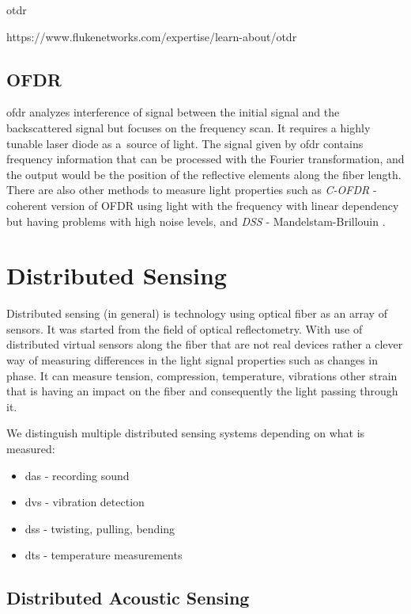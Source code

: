 \acl{otdr} 

https://www.flukenetworks.com/expertise/learn-about/otdr


\subsection{OFDR}

\ac{ofdr} analyzes interference of signal between the initial signal and the backscattered signal but focuses on the frequency scan. It requires a highly tunable laser diode as a~source of light. The signal given by \ac{ofdr} contains frequency information that can be processed with the Fourier transformation, and the output would be the position of the reflective elements along the fiber length. There are also other methods to measure light properties such as \textit{C-OFDR} - coherent version of OFDR using light with the frequency with linear dependency but having problems with high noise levels, and \textit{DSS} - Mandelstam-Brillouin \cite{kislov_das_newparadigm}.


\section{Distributed Sensing}

Distributed sensing (in general) is technology using optical fiber as an array of sensors. It was started from the field of optical reflectometry. With use of distributed virtual sensors along the fiber that are not real devices rather a clever way of measuring differences in the light signal properties such as changes in phase. It can measure tension, compression, temperature, vibrations other strain that is having an impact on the fiber and consequently the light passing through it\cite{dasKislov}.

We distinguish multiple distributed sensing systems depending on what is measured:
\begin{itemize}
    \item \ac{das} - recording sound
    \item \ac{dvs} - vibration detection
    \item \ac{dss} - twisting, pulling, bending
    \item \ac{dts} - temperature measurements
\end{itemize}

\subsection{Distributed Acoustic Sensing}

